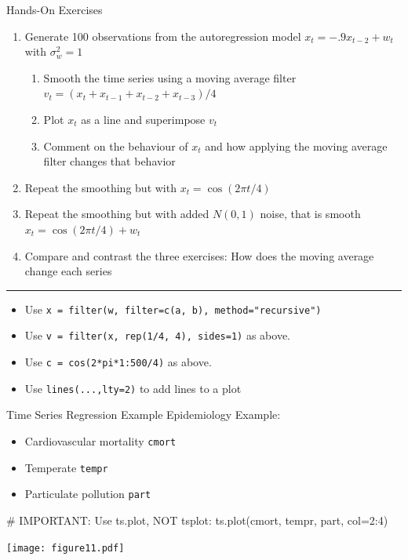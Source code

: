 \documentclass[ignorenonframetext,xcolor=x11names]{beamer}
\begin{document}
\begin{frame}{Hands-On Exercises}
\begin{enumerate}
   \item Generate 100 observations from the autoregression model $x_t = -.9x_{t-2} + w_t$ with $\sigma^2_w = 1$
  \begin{enumerate}
     \item Smooth the time series using a moving average filter $v_t = (x_t + x_{t-1} + x_{t-2} + x_{t-3})/4$
     \item Plot $x_t$ as a line and superimpose $v_t$
     \item Comment on the behaviour of $x_t$ and how applying the moving average filter changes that behavior
  \end{enumerate}
  \item Repeat the smoothing but with $x_t = \cos(2 \pi t / 4)$
  \item Repeat the smoothing but with added $N(0,1)$ noise, that is smooth $x_t = \cos(2\pi t /4) + w_t$
  \item Compare and contrast the three exercises: How does the moving average change each series
\end{enumerate}
\hrule
\footnotesize
\begin{itemize}
  \item Use \texttt{x = filter(w, filter=c(a, b), method="recursive")}
  \item Use \texttt{v = filter(x, rep(1/4, 4), sides=1)} as above.
  \item Use \texttt{c = cos(2*pi*1:500/4)} as above.
  \item Use \texttt{lines(...,lty=2)} to add lines to a plot
\end{itemize}
\end{frame}


\begin{frame}[fragile]{Time Series Regression Example}
Epidemiology Example:
\begin{itemize}
  \item Cardiovascular mortality \texttt{cmort}
  \item Temperate \texttt{tempr}
  \item Particulate pollution \texttt{part}
\end{itemize}

\begin{Rcode}
# IMPORTANT: Use ts.plot, NOT tsplot:
ts.plot(cmort, tempr, part, col=2:4)
\end{Rcode} 

\vspace{-2\baselineskip}
\texttt{[image: figure11.pdf]}
\end{frame}
\end{document}
